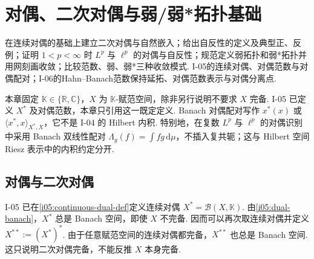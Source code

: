 \chapter{对偶、二次对偶与弱/弱*拓扑基础}\label{chap:I-07}
\FAChapterOpening
{在连续对偶的基础上建立二次对偶与自然嵌入；给出自反性的定义及典型正、反例；证明 \(\displaystyle 1<p<\infty\) 时 \(\displaystyle L^p\) 与 \(\displaystyle \ell^p\) 的对偶与自反性；规范定义弱拓扑和弱*拓扑并用网刻画收敛；比较范数、弱、弱*三种收敛模式.}
{I-05的连续对偶、对偶范数与对偶配对；I-06的Hahn--Banach范数保持延拓、对偶范数表示与对偶分离点.}
{\begin{center}
\end{center}}

本章固定 \(\displaystyle \mathbb K\in\{\mathbb R,\mathbb C\}\)，\(\displaystyle X\) 为 \(\displaystyle \mathbb K\)-赋范空间，除非另行说明不要求 \(\displaystyle X\) 完备. I-05 已定义 \(\displaystyle X^*\) 及对偶范数，本章只引用这一既定定义. Banach 对偶配对写作 \(\displaystyle x^*(x)\) 或 \(\displaystyle \langle x^*,x\rangle_{X^*,X}\)，它不是 I-04 的 Hilbert 内积. 特别地，在复数 \(\displaystyle L^p\) 与 \(\displaystyle \ell^p\) 的对偶识别中采用 Banach 双线性配对 \(\displaystyle \Lambda_g(f)=\int fg\,\mathrm{d}\mu\)，不插入复共轭；这与 Hilbert 空间 Riesz 表示中的内积约定分开.

\section{对偶与二次对偶}\label{sec:i07-dual-bidual}

I-05 已在\autoref{i05:continuous-dual-def}定义连续对偶 \(\displaystyle X^*=\mathcal B(X,\mathbb K)\). 由\autoref{i05:dual-banach}，\(\displaystyle X^*\) 总是 Banach 空间，即使 \(\displaystyle X\) 不完备. 因而可以再次取连续对偶并定义 \(\displaystyle X^{**}:=(X^*)^*\).
由于任意赋范空间的连续对偶都完备，\(\displaystyle X^{**}\) 也总是 Banach 空间. 这只说明二次对偶完备，不能反推 \(\displaystyle X\) 本身完备.

